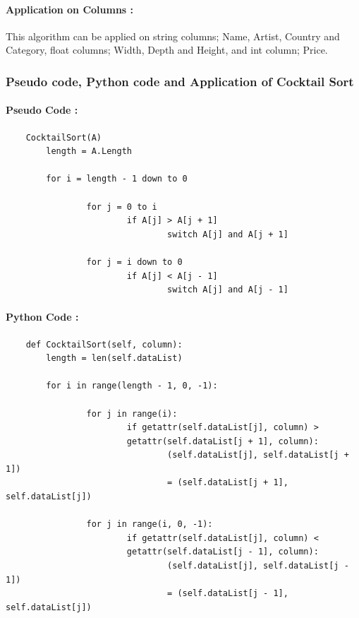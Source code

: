\documentclass[12pt]{article}
\begin{document}
    \paragraph{Application on Columns :} 
    This algorithm can be applied on string columns; Name, Artist, Country and Category, float columns; Width, Depth and Height, and int column; Price.
    
    \newpage
    \subsubsection{Pseudo code, Python code and Application of Cocktail Sort}
    \paragraph{Pseudo Code :}
    \begin{verbatim}
    CocktailSort(A)
        length = A.Length

        for i = length - 1 down to 0

                for j = 0 to i
                        if A[j] > A[j + 1]
                                switch A[j] and A[j + 1]

                for j = i down to 0
                        if A[j] < A[j - 1]
                                switch A[j] and A[j - 1]
    \end{verbatim}
    \paragraph{Python Code :}
    \begin{verbatim}
    def CocktailSort(self, column):
        length = len(self.dataList)

        for i in range(length - 1, 0, -1):

                for j in range(i):
                        if getattr(self.dataList[j], column) >
                        getattr(self.dataList[j + 1], column):
                                (self.dataList[j], self.dataList[j + 1])
                                = (self.dataList[j + 1], self.dataList[j])

                for j in range(i, 0, -1):
                        if getattr(self.dataList[j], column) <
                        getattr(self.dataList[j - 1], column):
                                (self.dataList[j], self.dataList[j - 1])
                                = (self.dataList[j - 1], self.dataList[j]) 
    \end{verbatim}
\end{document}
